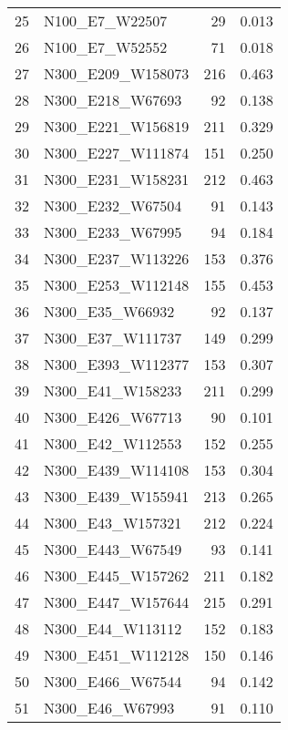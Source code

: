 \begin{table}
\begin{tabular}{llrr}
25 &      N100\_E7\_W22507 &    29 &             0.013 \\
26 &      N100\_E7\_W52552 &    71 &             0.018 \\
27 &   N300\_E209\_W158073 &   216 &             0.463 \\
28 &    N300\_E218\_W67693 &    92 &             0.138 \\
29 &   N300\_E221\_W156819 &   211 &             0.329 \\
30 &   N300\_E227\_W111874 &   151 &             0.250 \\
31 &   N300\_E231\_W158231 &   212 &             0.463 \\
32 &    N300\_E232\_W67504 &    91 &             0.143 \\
33 &    N300\_E233\_W67995 &    94 &             0.184 \\
34 &   N300\_E237\_W113226 &   153 &             0.376 \\
35 &   N300\_E253\_W112148 &   155 &             0.453 \\
36 &     N300\_E35\_W66932 &    92 &             0.137 \\
37 &    N300\_E37\_W111737 &   149 &             0.299 \\
38 &   N300\_E393\_W112377 &   153 &             0.307 \\
39 &    N300\_E41\_W158233 &   211 &             0.299 \\
40 &    N300\_E426\_W67713 &    90 &             0.101 \\
41 &    N300\_E42\_W112553 &   152 &             0.255 \\
42 &   N300\_E439\_W114108 &   153 &             0.304 \\
43 &   N300\_E439\_W155941 &   213 &             0.265 \\
44 &    N300\_E43\_W157321 &   212 &             0.224 \\
45 &    N300\_E443\_W67549 &    93 &             0.141 \\
46 &   N300\_E445\_W157262 &   211 &             0.182 \\
47 &   N300\_E447\_W157644 &   215 &             0.291 \\
48 &    N300\_E44\_W113112 &   152 &             0.183 \\
49 &   N300\_E451\_W112128 &   150 &             0.146 \\
50 &    N300\_E466\_W67544 &    94 &             0.142 \\
51 &     N300\_E46\_W67993 &    91 &             0.110 \\

\end{tabular}
\end{table}

